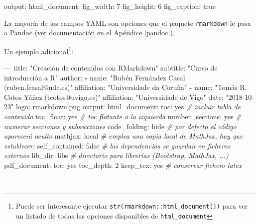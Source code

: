 \documentclass[]{book}
\newenvironment{Shaded}{\begin{snugshade}}{\end{snugshade}}
\newcommand{\KeywordTok}[1]{\textcolor[rgb]{0.13,0.29,0.53}{\textbf{#1}}}
\newcommand{\StringTok}[1]{\textcolor[rgb]{0.31,0.60,0.02}{#1}}
\newcommand{\CommentTok}[1]{\textcolor[rgb]{0.56,0.35,0.01}{\textit{#1}}}
\newcommand{\OtherTok}[1]{\textcolor[rgb]{0.56,0.35,0.01}{#1}}
\newcommand{\FunctionTok}[1]{\textcolor[rgb]{0.00,0.00,0.00}{#1}}
\newcommand{\AttributeTok}[1]{\textcolor[rgb]{0.77,0.63,0.00}{#1}}
\let\rmarkdownfootnote\footnote%
\def\footnote{\protect\rmarkdownfootnote}
\theoremstyle{definition}
\theoremstyle{definition}
\theoremstyle{definition}
\theoremstyle{remark}
\begin{document}
\begin{Shaded}
\begin{Highlighting}[]
\FunctionTok{output:}
  \FunctionTok{html_document:}
    \FunctionTok{fig_width:}\AttributeTok{ 7}
    \FunctionTok{fig_height:}\AttributeTok{ 6}
    \FunctionTok{fig_caption:}\AttributeTok{ true}
\end{Highlighting}
\end{Shaded}

La mayoría de los campos YAML son opciones que el paquete
\texttt{rmarkdown} le pasa a Pandoc (ver documentación en el Apéndice
\ref{pandoc}).

Un ejemplo adicional\footnote{Puede ser interesante ejecutar
  \texttt{str(rmarkdown::html\_document())} para ver un listado de todas
  las opciones disponibles de \texttt{html\_document}}:

\begin{Shaded}
\begin{Highlighting}[]
\OtherTok{---}
\FunctionTok{title:}\AttributeTok{ }\StringTok{"Creación de contenidos con RMarkdown"}
\FunctionTok{subtitle:}\AttributeTok{ }\StringTok{"Curso de introducción a R"}
\FunctionTok{author:}
\KeywordTok{-} \FunctionTok{name:}\AttributeTok{ }\StringTok{"Rubén Fernández Casal (ruben.fcasal@udc.es)"}
  \FunctionTok{affiliation:}\AttributeTok{ }\StringTok{"Universidade da Coruña"}
\KeywordTok{-} \FunctionTok{name:}\AttributeTok{ }\StringTok{"Tomás R. Cotos Yáñez (tcotos@uvigo.es)"}
  \FunctionTok{affiliation:}\AttributeTok{ }\StringTok{"Universidade de Vigo"}
\FunctionTok{date:}\AttributeTok{ }\StringTok{"2018-10-23"}
\FunctionTok{logo:}\AttributeTok{ rmarkdown.png}
\FunctionTok{output:}
  \FunctionTok{html_document:}
    \FunctionTok{toc:}\AttributeTok{ yes                  }\CommentTok{# incluir tabla de contenido}
    \FunctionTok{toc_float:}\AttributeTok{ yes            }\CommentTok{# toc flotante a la izquierda}
    \FunctionTok{number_sections:}\AttributeTok{ yes      }\CommentTok{# numerar secciones y subsecciones}
    \FunctionTok{code_folding:}\AttributeTok{ hide        }\CommentTok{# por defecto el código aparecerá oculto}
    \FunctionTok{mathjax:}\AttributeTok{ local            }\CommentTok{# emplea una copia local de MathJax, hay que establecer:}
    \FunctionTok{self_contained:}\AttributeTok{ false     }\CommentTok{# las dependencias se guardan en ficheros externos}
    \FunctionTok{lib_dir:}\AttributeTok{ libs             }\CommentTok{# directorio para librerías (Bootstrap, MathJax, ...)}
  \FunctionTok{pdf_document:}
    \FunctionTok{toc:}\AttributeTok{ yes}
    \FunctionTok{toc_depth:}\AttributeTok{ 2}
    \FunctionTok{keep_tex:}\AttributeTok{ yes             }\CommentTok{# conservar fichero latex}
    
\OtherTok{---}
\end{Highlighting}
\end{Shaded}
\end{document}
